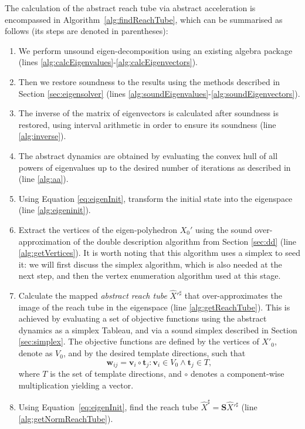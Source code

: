 \documentclass[twocolumn]{autart}    %
\newcommand{\mat}[1]{\boldsymbol{#1}}
\renewcommand{\vec}[1]{\boldsymbol{#1}}
\begin{document}
The calculation of the abstract reach tube via abstract acceleration is
encompassed in Algorithm~\ref{alg:findReachTube}, which can be summarised as
follows (its steps are denoted in parentheses):
%
\begin{enumerate}
%
\item We perform unsound eigen-decomposition using an existing algebra package (lines \ref{alg:calcEigenvalues}-\ref{alg:calcEigenvectors}).
%
\item Then we restore soundness to the results using the methods described in Section \ref{sec:eigensolver} (lines \ref{alg:soundEigenvalues}-\ref{alg:soundEigenvectors}). 
%
\item The inverse of the matrix of eigenvectors is calculated after soundness is restored, using interval arithmetic in order to ensure its soundness (line \ref{alg:inverse}).
%
\item The abstract dynamics are obtained by evaluating the convex hull of all powers of eigenvalues up to the desired number of iterations as described in \cite{cattaruzza2015unbounded} (line \ref{alg:aa}).
%
\item Using Equation \eqref{eq:eigenInit}, transform the initial state into the eigenspace (line \ref{alg:eigeninit}).
%
\item Extract the vertices of the eigen-polyhedron $X_0'$ using the sound over-approximation of the double description algorithm \cite{fukuda1996double} from Section \ref{sec:dd} (line \ref{alg:getVertices}). It is worth noting that this algorithm uses a simplex to seed it: we will first discuss the simplex algorithm, which is also needed at the next step, and then the vertex enumeration algorithm used at this stage. 
%
\item Calculate the mapped \emph{abstract reach tube} ${\hat{X}'^\sharp}$
that over-approximates the image of the reach tube in the eigenspace (line
\ref{alg:getReachTube}).  This is achieved by evaluating a set of objective
functions using the abstract dynamics as a simplex Tableau, and via a sound
simplex described in Section \ref{sec:simplex}.  The objective functions are
defined by the vertices of $X'_0$, denote as $V_0$, and by the desired
template directions, such that
%
\begin{equation*}
\vec{w}_{ij}= \vec{v}_i \circ \vec{t}_j : \vec{v}_i \in V_0 \wedge \vec{t}_j \in T,
\end{equation*}
%
where $T$ is the set of template directions, and $\circ$ denotes a
component-wise multiplication yielding a vector.
%
\item Using Equation~\eqref{eq:eigenInit}, find the reach tube
$\hat{X}^\sharp=\mat{S}{\hat{X}'^\sharp}$ (line \ref{alg:getNormReachTube}).
%
\end{enumerate}
\end{document}
